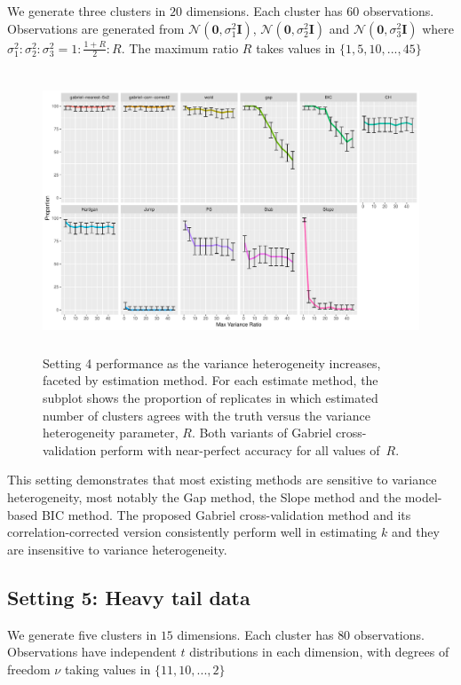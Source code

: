 \documentclass[12pt]{article}
\begin{document}
We generate three clusters in $20$ dimensions. Each cluster has $60$
observations.  Observations are generated from
$\mathcal{N}\left(\mathbf{0},\sigma_1^2\mathbf{I}\right)$,
$\mathcal{N}\left(\mathbf{0},\sigma_2^2\mathbf{I}\right)$ and
$\mathcal{N}\left(\mathbf{0},\sigma_3^2\mathbf{I}\right)$ where $\sigma_1^2 :
\sigma_2^2: \sigma_3^2 = 1:\frac{1+R}{2}:R$. The maximum ratio $R$ takes
values in $\{1,5,10,...,45\}$
	
\begin{figure}[H]
\centering
\includegraphics[width=5.5in, height=3.3in]{main_code/demo/bench/setting4/Facet.pdf}
\caption{Setting 4 performance as the variance heterogeneity increases,
    faceted by estimation method. For each estimate method, the subplot shows the proportion of
    replicates in which estimated number of clusters agrees with the truth
    versus the variance heterogeneity parameter,  $R$. Both variants of Gabriel
    cross-validation perform with near-perfect accuracy for all values of~$R$.}
\label{fig:setting4}
\end{figure}

This setting demonstrates that most existing methods are sensitive to variance
heterogeneity, most notably the Gap method, the Slope method and the model-based BIC method. The
proposed Gabriel cross-validation method and its correlation-corrected version
consistently perform well in estimating $k$ and they are insensitive to
variance heterogeneity.
	

\subsection{Setting 5: Heavy tail data}

We generate five clusters in $15$ dimensions. Each cluster has $80$
observations.  Observations have independent $t$ distributions in each
dimension, with degrees of freedom $\nu$ taking values in $\{11,10,...,2\}$
     
\end{document}
